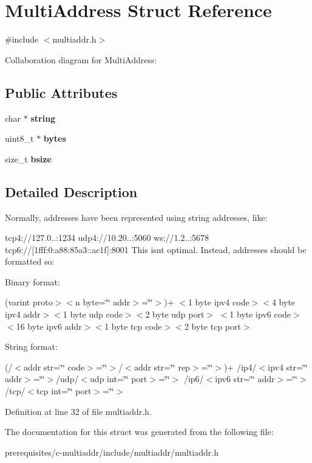 \hypertarget{struct_multi_address}{}\section{Multi\+Address Struct Reference}
\label{struct_multi_address}


{\ttfamily \#include $<$multiaddr.\+h$>$}



Collaboration diagram for Multi\+Address\+:
\subsection*{Public Attributes}
\begin{DoxyCompactItemize}
\item 
\mbox{\label{struct_multi_address_a9ca012540578abd31e723e4e91a50640}} 
char $\ast$ {\bfseries string}
\item 
\mbox{\label{struct_multi_address_aa5563155eb19110b87b02685b0142e21}} 
uint8\+\_\+t $\ast$ {\bfseries bytes}
\item 
\mbox{\label{struct_multi_address_ad4aa916f7b88d4b9072f8ad9e6eeed59}} 
size\+\_\+t {\bfseries bsize}
\end{DoxyCompactItemize}


\subsection{Detailed Description}
Normally, addresses have been represented using string addresses, like\+:

tcp4\+://127.0..\+:1234 udp4\+://10.20..\+:5060 ws\+://1.2..\+:5678 tcp6\+://\mbox{[}1fff\+:0\+:a88\+:85a3\+::ac1f\mbox{]}\+:8001 This isn\textquotesingle{}t optimal. Instead, addresses should be formatted so\+:

Binary format\+:

(varint proto$>$$<$n byte=\char`\"{}\char`\"{} addr$>$=\char`\"{}\char`\"{}$>$)+ $<$1 byte ipv4 code$>$$<$4 byte ipv4 addr$>$$<$1 byte udp code$>$$<$2 byte udp port$>$ $<$1 byte ipv6 code$>$$<$16 byte ipv6 addr$>$$<$1 byte tcp code$>$$<$2 byte tcp port$>$

String format\+:

(/$<$addr str=\char`\"{}\char`\"{} code$>$=\char`\"{}\char`\"{}$>$/$<$addr str=\char`\"{}\char`\"{} rep$>$=\char`\"{}\char`\"{}$>$)+ /ip4/$<$ipv4 str=\char`\"{}\char`\"{} addr$>$=\char`\"{}\char`\"{}$>$/udp/$<$udp int=\char`\"{}\char`\"{} port$>$=\char`\"{}\char`\"{}$>$ /ip6/$<$ipv6 str=\char`\"{}\char`\"{} addr$>$=\char`\"{}\char`\"{}$>$/tcp/$<$tcp int=\char`\"{}\char`\"{} port$>$=\char`\"{}\char`\"{}$>$ 

Definition at line 32 of file multiaddr.\+h.



The documentation for this struct was generated from the following file\+:\begin{DoxyCompactItemize}
\item 
prerequisites/c-\/multiaddr/include/multiaddr/multiaddr.\+h\end{DoxyCompactItemize}
